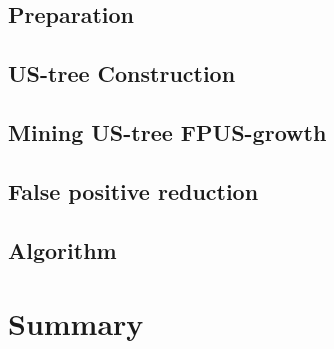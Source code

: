 \subsection{Preparation}


\subsection{US-tree Construction}

\subsection{Mining US-tree FPUS-growth}

\newpage
\subsection{False positive reduction}

\newpage
\subsection{Algorithm}


\section{Summary}

%